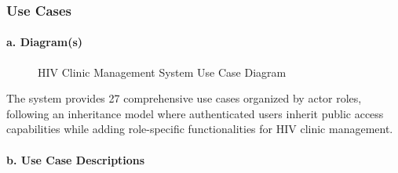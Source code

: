 \documentclass[12pt,a4paper]{article}
\begin{document}
\subsubsection{Use Cases}

\paragraph{a. Diagram(s)}

\begin{figure}[H]
\centering
\caption{HIV Clinic Management System Use Case Diagram}
\label{fig:use-case-diagram}
\end{figure}

The system provides 27 comprehensive use cases organized by actor roles, following an inheritance model where authenticated users inherit public access capabilities while adding role-specific functionalities for HIV clinic management.

\paragraph{b. Use Case Descriptions}
\end{document}
